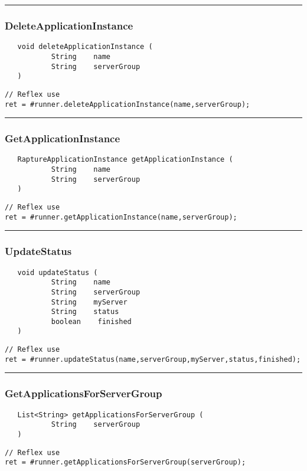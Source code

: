 \rule{15cm}{2pt}
\subsubsection{DeleteApplicationInstance}
\label{Api:DeleteApplicationInstance}
\begin{verbatim}
   void deleteApplicationInstance (
           String    name
           String    serverGroup
   )
\end{verbatim}
\begin{lstlisting}[language=reflex]
// Reflex use
ret = #runner.deleteApplicationInstance(name,serverGroup);
\end{lstlisting}



\rule{15cm}{2pt}
\subsubsection{GetApplicationInstance}
\label{Api:GetApplicationInstance}
\begin{verbatim}
   RaptureApplicationInstance getApplicationInstance (
           String    name
           String    serverGroup
   )
\end{verbatim}
\begin{lstlisting}[language=reflex]
// Reflex use
ret = #runner.getApplicationInstance(name,serverGroup);
\end{lstlisting}



\rule{15cm}{2pt}
\subsubsection{UpdateStatus}
\label{Api:UpdateStatus}
\begin{verbatim}
   void updateStatus (
           String    name
           String    serverGroup
           String    myServer
           String    status
           boolean    finished
   )
\end{verbatim}
\begin{lstlisting}[language=reflex]
// Reflex use
ret = #runner.updateStatus(name,serverGroup,myServer,status,finished);
\end{lstlisting}



\rule{15cm}{2pt}
\subsubsection{GetApplicationsForServerGroup}
\label{Api:GetApplicationsForServerGroup}
\begin{verbatim}
   List<String> getApplicationsForServerGroup (
           String    serverGroup
   )
\end{verbatim}
\begin{lstlisting}[language=reflex]
// Reflex use
ret = #runner.getApplicationsForServerGroup(serverGroup);
\end{lstlisting}



